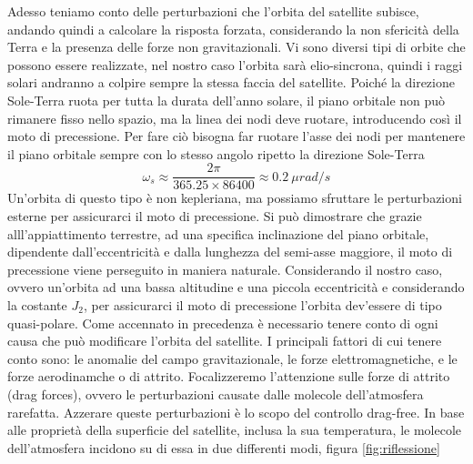 Adesso teniamo conto delle perturbazioni che l'orbita del satellite subisce,
andando quindi a calcolare la risposta forzata, considerando la non sfericità
della Terra e la presenza delle forze non gravitazionali. Vi sono diversi tipi
di orbite che possono essere realizzate, nel nostro caso l'orbita sarà
elio-sincrona, quindi i raggi solari andranno a colpire sempre la stessa faccia
del satellite. Poiché la direzione Sole-Terra ruota per tutta la durata
dell'anno solare, il piano orbitale non può rimanere fisso nello spazio, ma la
linea dei nodi deve ruotare, introducendo così il moto di precessione. Per fare
ciò bisogna far ruotare l'asse dei nodi per mantenere il piano orbitale sempre
con lo stesso angolo ripetto la direzione Sole-Terra
\begin{equation}
\omega_s\approx \frac{2\pi}{365.25\times86400}\approx 0.2 \ \mu rad/s
\end{equation}
Un'orbita di questo tipo è non kepleriana, ma possiamo sfruttare le
perturbazioni esterne per assicurarci il moto di precessione. Si può dimostrare
che grazie alll'appiattimento terrestre, ad una specifica inclinazione del piano
orbitale, dipendente dall'eccentricità e dalla lunghezza del semi-asse maggiore,
il moto di precessione viene perseguito in maniera naturale. Considerando il
nostro caso, ovvero un'orbita ad una bassa altitudine e una piccola eccentricità
e considerando la costante $J_2$, per assicurarci il
moto di precessione l'orbita dev'essere di tipo quasi-polare.
Come accennato in precedenza è necessario tenere conto di ogni causa che può
modificare l’orbita del satellite. I principali fattori di cui tenere conto
sono: le anomalie del campo gravitazionale, le forze elettromagnetiche, e le
forze aerodinamche o di attrito. Focalizzeremo l'attenzione sulle forze
di attrito (drag forces), ovvero le perturbazioni causate dalle molecole
dell'atmosfera rarefatta. Azzerare queste perturbazioni è lo scopo del controllo
drag-free.
In base alle proprietà della superficie del satellite, inclusa la sua
temperatura, le molecole dell'atmosfera incidono su di essa in due differenti
modi, figura \ref{fig:riflessione}
